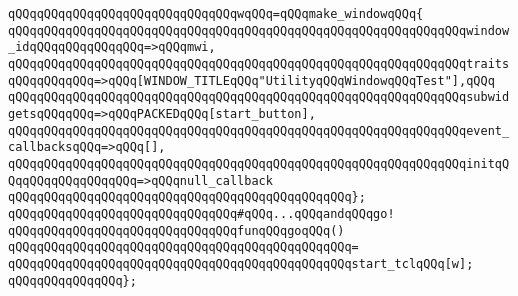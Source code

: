 \verb|qQQqqQQqqQQqqQQqqQQqqQQqqQQqqQQqwqQQq=qQQqmake_windowqQQq{|\newline
\verb|qQQqqQQqqQQqqQQqqQQqqQQqqQQqqQQqqQQqqQQqqQQqqQQqqQQqqQQqqQQqqQQqwindow_idqQQqqQQqqQQqqQQq=>qQQqmwi,|\newline
\verb|qQQqqQQqqQQqqQQqqQQqqQQqqQQqqQQqqQQqqQQqqQQqqQQqqQQqqQQqqQQqqQQqtraitsqQQqqQQqqQQq=>qQQq[WINDOW_TITLEqQQq"UtilityqQQqWindowqQQqTest"],qQQq|\newline
\verb|qQQqqQQqqQQqqQQqqQQqqQQqqQQqqQQqqQQqqQQqqQQqqQQqqQQqqQQqqQQqqQQqsubwidgetsqQQqqQQq=>qQQqPACKEDqQQq[start_button],|\newline
\verb|qQQqqQQqqQQqqQQqqQQqqQQqqQQqqQQqqQQqqQQqqQQqqQQqqQQqqQQqqQQqqQQqevent_callbacksqQQq=>qQQq[],|\newline
\verb|qQQqqQQqqQQqqQQqqQQqqQQqqQQqqQQqqQQqqQQqqQQqqQQqqQQqqQQqqQQqqQQqinitqQQqqQQqqQQqqQQqqQQq=>qQQqnull_callback|\newline
\verb|qQQqqQQqqQQqqQQqqQQqqQQqqQQqqQQqqQQqqQQqqQQqqQQq};|\newline
\newline
\newline
\verb|qQQqqQQqqQQqqQQqqQQqqQQqqQQqqQQq#qQQq...qQQqandqQQqgo!|\newline
\newline
\verb|qQQqqQQqqQQqqQQqqQQqqQQqqQQqqQQqfunqQQqgoqQQq()|\newline
\verb|qQQqqQQqqQQqqQQqqQQqqQQqqQQqqQQqqQQqqQQqqQQqqQQq=|\newline
\verb|qQQqqQQqqQQqqQQqqQQqqQQqqQQqqQQqqQQqqQQqqQQqqQQqstart_tclqQQq[w];|\newline
\newline
\verb|qQQqqQQqqQQqqQQq};|\newline
\newline
\newline
\newline
\newline
\newline

